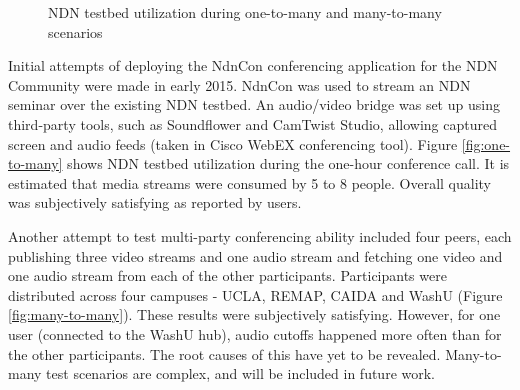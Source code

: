 \documentclass{icn/sig-alternate-2012} %
\begin{document}
\begin{figure}[t!]
\centering


\caption{NDN testbed utilization during one-to-many and many-to-many scenarios}
\label{fig:testbed-utilization}
\end{figure}

Initial attempts of deploying the NdnCon conferencing application for the NDN Community were made in early 2015. NdnCon was used to stream an NDN seminar over the existing NDN testbed. An audio/video bridge was set up using third-party tools, such as Soundflower and CamTwist Studio, allowing captured screen and audio feeds (taken in Cisco WebEX conferencing tool). Figure \ref{fig:one-to-many} shows NDN testbed utilization during the one-hour conference call. It is estimated that media streams were consumed by 5 to 8 people. Overall quality was subjectively satisfying as reported by users.

Another attempt to test multi-party conferencing ability included four peers, each publishing three video streams and one audio stream and fetching one video and one audio stream from each of the other participants. Participants were distributed across four campuses - UCLA, REMAP, CAIDA and WashU (Figure \ref{fig:many-to-many}). These results were subjectively satisfying. However, for one user (connected to the WashU hub), audio cutoffs happened more often than for the other participants. The root causes of this have yet to be revealed. Many-to-many test scenarios are complex, and will be included in future work.
\end{document}

